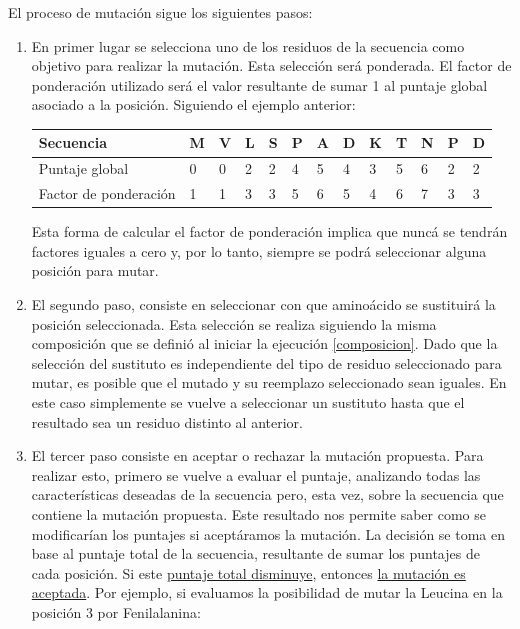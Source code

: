 El proceso de mutación sigue los siguientes pasos:
\begin{enumerate}
 \item En primer lugar se selecciona uno de los residuos de la secuencia como objetivo para realizar la mutación. 
 Esta selección será ponderada. El factor de ponderación utilizado será el valor resultante de sumar 1 al puntaje global asociado a la posición.
 Siguiendo el ejemplo anterior:
 
 \begin{center}
 \begin{tabular}{lllllllllllll} 
 \hline
Secuencia &  \textbf{M} & \textbf{V} & \textbf{L} & \textbf{S} & \textbf{P} & \textbf{A} & \textbf{D} & \textbf{K} & \textbf{T} & \textbf{N} & \textbf{P} & \textbf{D}\\  \hline
Puntaje global & 0 & 0 & 2 & 2 & 4 & 5 & 4 & 3 & 5 & 6 & 2 & 2\\  \hline
Factor de ponderación & 1 & 1 & 3 & 3 & 5 & 6 & 5 & 4 & 6 & 7 & 3 & 3\\  \hline
\end{tabular}
 \end{center}
 
\vspace{0.5cm}
Esta forma de calcular el factor de ponderación implica que nuncá se tendrán factores iguales a cero y, por lo tanto, siempre se podrá seleccionar alguna posición para mutar.

   \item El segundo paso, consiste en seleccionar con que aminoácido se sustituirá la posición seleccionada. 
   Esta selección se realiza siguiendo la misma composición que se definió al iniciar la ejecución \ref{composicion}. 
   Dado que la selección del sustituto es independiente del tipo de residuo seleccionado para mutar,
   es posible que el mutado y su reemplazo seleccionado sean iguales. 
   En este caso simplemente se vuelve a seleccionar un sustituto hasta que el resultado sea un residuo distinto al anterior.     
    \item El tercer paso consiste en aceptar o rechazar la mutación propuesta.
    Para realizar esto, primero se vuelve a evaluar el puntaje, analizando todas las características deseadas de la secuencia pero, esta vez, sobre la secuencia que contiene la mutación propuesta.
    Este resultado nos permite saber como se modificarían los puntajes si aceptáramos la mutación. 
    La decisión se toma en base al puntaje total de la secuencia, resultante de sumar los puntajes de cada posición. Si este  \underline{puntaje total disminuye}, entonces \underline{la mutación es aceptada}. 
    Por ejemplo, si evaluamos la posibilidad de mutar la Leucina en la posición 3 por Fenilalanina:


\end{enumerate}
